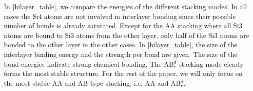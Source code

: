 In \autoref{bilayer_table}, we compare the energies of the different stacking modes. In all cases the Si4 atoms are not involved in interlayer bonding since their possible number of bonds is already saturated.  Except for the AA stacking where all Si3 atoms are bound to Si3 atoms from the other layer, only half of the Si3 atoms are bonded to the other layer in the other cases. In \autoref{bilayer_table}, the size of the interlayer binding energy and the strength per bond are given. The size of the bond energies indicate strong chemical bonding. The  AB$_r^d$ stacking mode clearly forms the most stable structure. For the rest of the paper, we will only focus on the most stable AA and AB-type stacking, i.e. AA and AB$_r^d$. 

\begin{landscape}


\end{landscape}
